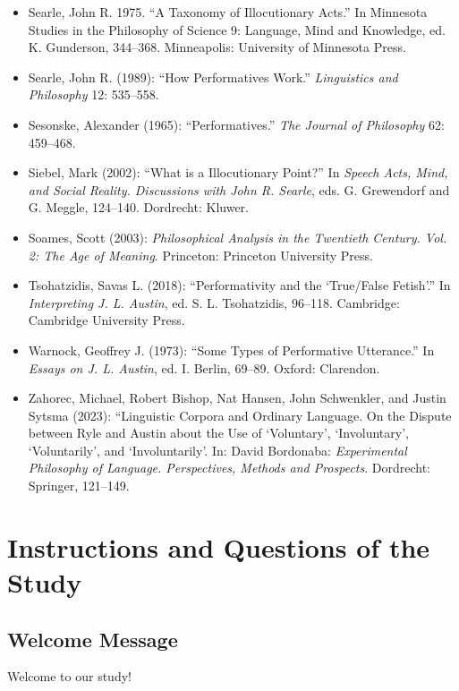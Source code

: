 \documentclass[egregdoesnotlikesansseriftitles,12pt]{scrartcl}
\begin{document}
\begin{itemize}[label=,leftmargin=\parindent,itemindent=-\parindent]
   \item Searle, John R. 1975. ``A Taxonomy of Illocutionary Acts.'' In Minnesota Studies in the Philosophy of Science 9: Language, Mind and Knowledge, ed. K. Gunderson, 344--368. Minneapolis: University of Minnesota Press.
   \item Searle, John R. (1989): ``How Performatives Work.'' \textit{Linguistics and Philosophy} 12: 535--558.
   \item Sesonske, Alexander (1965): ``Performatives.'' \textit{The Journal of Philosophy} 62: 459--468.
   \item Siebel, Mark (2002): ``What is a Illocutionary Point?'' In \textit{Speech Acts, Mind, and Social Reality. Discussions with John R. Searle}, eds. G. Grewendorf and G. Meggle, 124--140. Dordrecht: Kluwer.
   \item Soames, Scott (2003): \textit{Philosophical Analysis in the Twentieth Century. Vol. 2: The Age of Meaning}. Princeton: Princeton University Press.
   \item Tsohatzidis, Savas L. (2018): ``Performativity and the `True/False Fetish'.'' In \textit{Interpreting J. L. Austin}, ed. S. L. Tsohatzidis, 96--118. Cambridge: Cambridge University Press.
   \item Warnock, Geoffrey J. (1973): ``Some Types of Performative Utterance.'' In \textit{Essays on J. L. Austin}, ed. I. Berlin, 69--89. Oxford: Clarendon.
   \item Zahorec, Michael, Robert Bishop, Nat Hansen, John Schwenkler, and Justin Sytsma (2023): ``Linguistic Corpora and Ordinary Language. On the Dispute between Ryle and Austin about the Use of `Voluntary', `Involuntary', `Voluntarily', and `Involuntarily'. In: David Bordonaba: \textit{Experimental Philosophy of Language. Perspectives, Methods and Prospects}. Dordrecht: Springer, 121--149.
\end{itemize}


\clearpage
\appendix
\section{Instructions and Questions of the Study}\label{sec:app_instructions}


\subsection{Welcome Message}\label{sec:app_welcome}
Welcome to our study!
\end{document}
